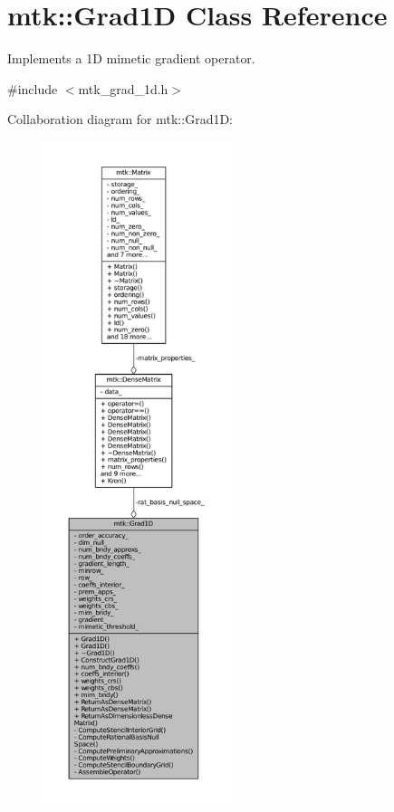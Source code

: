 \hypertarget{classmtk_1_1Grad1D}{\section{mtk\+:\+:Grad1\+D Class Reference}
\label{classmtk_1_1Grad1D}
}


Implements a 1\+D mimetic gradient operator.  




{\ttfamily \#include $<$mtk\+\_\+grad\+\_\+1d.\+h$>$}



Collaboration diagram for mtk\+:\+:Grad1\+D\+:
\nopagebreak
\begin{figure}[H]
\begin{center}
\leavevmode
\includegraphics[height=550pt]{classmtk_1_1Grad1D__coll__graph}
\end{center}
\end{figure}
